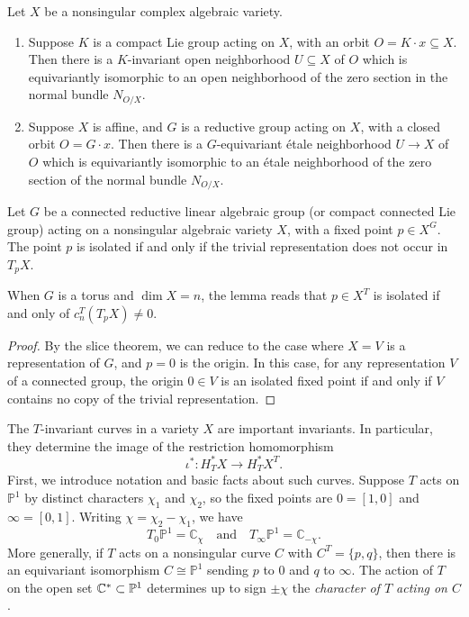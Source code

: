 \begin{theorem}
	\label{thm:slice}
	Let $X$ be a nonsingular complex algebraic variety.
	\begin{enumerate}
		\item Suppose $K$ is a compact Lie group acting on $X$, with an orbit $O = K \cdot x \subseteq X$. Then there is a $K$-invariant open neighborhood $U \subseteq X$ of $O$ which is equivariantly isomorphic to an open neighborhood of the zero section in the normal bundle $N_{O/X}$.

		\item Suppose $X$ is affine, and $G$ is a reductive group acting on $X$, with a closed orbit $O = G \cdot x$. Then there is a $G$-equivariant étale neighborhood $U \to X$ of $O$ which is equivariantly isomorphic to an étale neighborhood of the zero section of the normal bundle $N_{O/X}$.
	\end{enumerate}
\end{theorem}
\begin{lemma}
	Let $G$ be a connected reductive linear algebraic group (or compact connected Lie group) acting on a nonsingular algebraic variety $X$, with a fixed point $p \in X^G$. The point $p$ is isolated if and only if the trivial representation does not occur in $T_p X$.
\end{lemma}
When $G$ is a torus and $\dim X = n$, the lemma reads that $p\in X^T$ is isolated if and only of $c_n^T(T_pX) \neq 0$.
\begin{proof}
	By the slice theorem, we can reduce to the case where $X = V$ is a representation of $G$, and $p = 0$ is the origin. In this case, for any representation $V$ of a connected group, the origin $0 \in V$ is an isolated fixed point if and only if $V$ contains no copy of the trivial representation.
\end{proof}

The \( T \)-invariant curves in a variety \( X \) are important invariants. In particular, they determine the image of the restriction homomorphism
\[
	\iota^* : H_T^*X \to H_T^*X^T.
\]
First, we introduce notation and basic facts about such curves. Suppose \( T \) acts on \( \mathbb{P}^1 \) by distinct characters \( \chi_1 \) and \( \chi_2 \), so the fixed points are \( 0 = [1, 0] \) and \( \infty = [0, 1] \). Writing \( \chi = \chi_2 - \chi_1 \), we have
\[
	T_0\mathbb{P}^1 = \mathbb{C}_\chi \quad \text{and} \quad T_\infty\mathbb{P}^1 = \mathbb{C}_{-\chi}.
\]
More generally, if \( T \) acts on a nonsingular curve \( C \) with \( C^T = \{p, q\} \), then there is an equivariant isomorphism \( C \cong \mathbb{P}^1 \) sending \( p \) to \( 0 \) and \( q \) to \( \infty \). The action of $T$ on the open set $\mathbb{C}^*\subset\mathbb{P}^1$ determines up to sign \( \pm\chi \) the \emph{character of \( T \) acting on \( C \)}.

